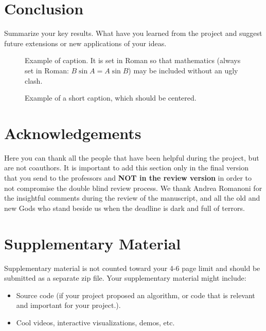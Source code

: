 \documentclass[10pt,twocolumn,letterpaper]{article}
\begin{document}
\section{Conclusion}
Summarize your key results. What have you learned from the project and suggest future extensions or new applications of your ideas.


\begin{figure}[t]
\begin{center}
\fbox{\rule{0pt}{2in} \rule{0.9\linewidth}{0pt}}
\end{center}
   \caption{Example of caption.  It is set in Roman so that mathematics
   (always set in Roman: $B \sin A = A \sin B$) may be included without an
   ugly clash.}
\label{fig:long}
\label{fig:onecol}
\end{figure}


\begin{figure*}
\begin{center}
\fbox{\rule{0pt}{2in} \rule{.9\linewidth}{0pt}}
\end{center}
   \caption{Example of a short caption, which should be centered.}
\label{fig:short}
\end{figure*}

\section*{Acknowledgements}
Here you can thank all the people that have been helpful during the project, but are not coauthors. It is important to add this section only in the final version that you send to the professors and \textbf{NOT in the review version} in order to not compromise the double blind review process. We thank Andrea Romanoni for the insightful comments during the review of the manuscript, and all the old and new Gods who stand beside us when the deadline is dark and full of terrors.

\appendix
\section{Supplementary Material}
Supplementary material is not counted toward your 4-6 page limit and should be submitted as a separate zip file. Your supplementary material might include:
\begin{itemize}
    \item Source code (if your project proposed an algorithm, or code that is relevant and important for your project.).
    \item Cool videos, interactive visualizations, demos, etc.
\end{itemize}
\end{document}
